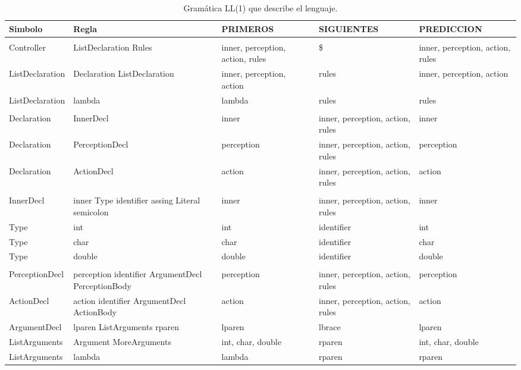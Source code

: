 

 \begin{table}[H]
   \centering
   \caption{Gramática LL(1) que describe el lenguaje.}
     \begin{tabularx}{\textwidth}{BBBBB}
     \toprule
     Simbolo & Regla & PRIMEROS & SIGUIENTES & PREDICCION \\
     \midrule
           &       &       &       &  \\
     Controller & ListDeclaration Rules & inner, perception, action, rules & \$    & inner, perception, action, rules \\
     ListDeclaration & Declaration ListDeclaration & inner, perception, action & rules & inner, perception, action \\
     ListDeclaration & lambda & lambda & rules & rules \\
           &       &       &       &  \\
     Declaration & InnerDecl & inner & inner, perception, action, rules & inner \\
     Declaration & PerceptionDecl & perception & inner, perception, action, rules & perception \\
     Declaration & ActionDecl & action & inner, perception, action, rules & action \\
           &       &       &       &  \\
     InnerDecl & inner Type identifier assing Literal semicolon & inner & inner, perception, action, rules & inner \\
     Type  & int   & int   & identifier & int \\
     Type  & char  & char  & identifier & char \\
     Type  & double & double & identifier & double \\
           &       &       &       &  \\
     PerceptionDecl & perception identifier ArgumentDecl PerceptionBody & perception & inner, perception, action, rules & perception \\
     ActionDecl & action identifier ArgumentDecl ActionBody & action & inner, perception, action, rules & action \\
     ArgumentDecl & lparen ListArguments rparen & lparen & lbrace & lparen \\
     ListArguments & Argument MoreArguments & int, char, double & rparen & int, char, double \\
     ListArguments & lambda & lambda & rparen & rparen \\

\end{tabularx}
\end{table}
